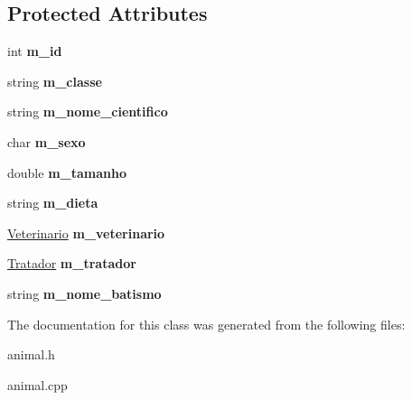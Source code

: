\subsection*{Protected Attributes}
\begin{DoxyCompactItemize}
\item 
\mbox{\label{classAnimal_a1a39448480e098fc74b5b67c4921a5ec}} 
int {\bfseries m\+\_\+id}
\item 
\mbox{\label{classAnimal_a46c2a87591d201f67a6ddd0db794cc44}} 
string {\bfseries m\+\_\+classe}
\item 
\mbox{\label{classAnimal_a387539564900b1fb8580f7cd0c7a3a11}} 
string {\bfseries m\+\_\+nome\+\_\+cientifico}
\item 
\mbox{\label{classAnimal_aaa6d77e661ed0fa9a33500588c8acfef}} 
char {\bfseries m\+\_\+sexo}
\item 
\mbox{\label{classAnimal_afe83ba40e79b42d06b0c95f61aaa0218}} 
double {\bfseries m\+\_\+tamanho}
\item 
\mbox{\label{classAnimal_a6bcc4913ef54988ddc4e938c6033ff35}} 
string {\bfseries m\+\_\+dieta}
\item 
\mbox{\label{classAnimal_a60c0cf35ac734a347bf4b30fe54399ed}} 
\hyperlink{classVeterinario}{Veterinario} {\bfseries m\+\_\+veterinario}
\item 
\mbox{\label{classAnimal_ac2afba8f2932c13244bd6eba44ac0ae8}} 
\hyperlink{classTratador}{Tratador} {\bfseries m\+\_\+tratador}
\item 
\mbox{\label{classAnimal_a3addde93c38579b4c63612dbf7ea3631}} 
string {\bfseries m\+\_\+nome\+\_\+batismo}
\end{DoxyCompactItemize}


The documentation for this class was generated from the following files\+:\begin{DoxyCompactItemize}
\item 
animal.\+h\item 
animal.\+cpp\end{DoxyCompactItemize}
